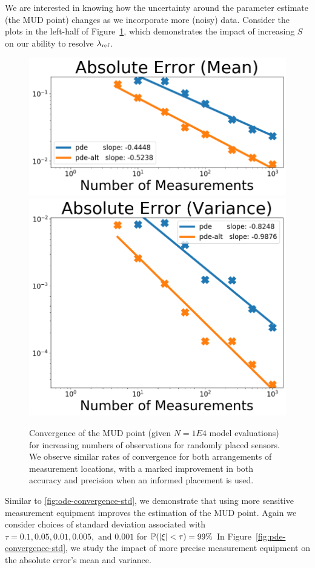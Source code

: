 We are interested in knowing how the uncertainty around the parameter estimate (the MUD point) changes as we incorporate more (noisy) data.
Consider the plots in the left-half of Figure~\ref{fig:pde-convergence-obs}, which demonstrates the impact of increasing $S$ on our ability to resolve $\lambda_\text{ref}$.


\begin{figure}[htbp]
  \centering
  \includegraphics[width=0.475\linewidth]{figures/pde/pde_convergence_mud_obs_mean}
  \includegraphics[width=0.475\linewidth]{figures/pde/pde_convergence_mud_obs_var}
  \caption{Convergence of the MUD point (given $N=1E4$ model evaluations) for increasing numbers of observations for randomly placed sensors.
  We observe similar rates of convergence for both arrangements of measurement locations, with a marked improvement in both accuracy and precision when an informed placement is used.
  }
  \label{fig:pde-convergence-obs}
\end{figure}


Similar to \ref{fig:ode-convergence-std}, we demonstrate that using more sensitive measurement equipment improves the estimation of the MUD point.
Again we consider choices of standard deviation associated with $\tau = 0.1, 0.05, 0.01, 0.005, \text{ and } 0.001$ for $\mathbb{P}( \left\vert\xi\right\vert < \tau ) = 99\%$
In Figure~\ref{fig:pde-convergence-std}, we study the impact of more precise measurement equipment on the absolute error's mean and variance.


